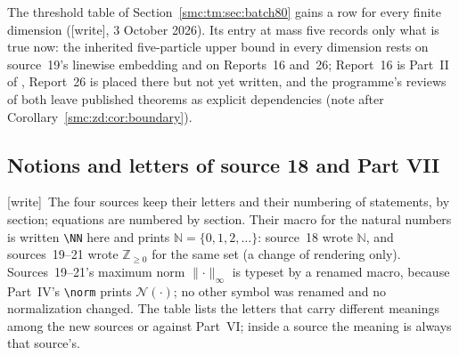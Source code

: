 \documentclass[11pt,letterpaper]{article}
\numberwithin{equation}{section}
\theoremstyle{definition}
\theoremstyle{remark}
\newcommand{\NN}{\mathbb N}
\newcommand{\wtag}{\textup{[write]}}
\newcommand{\norm}[1]{\mathcal N(#1)}
\begin{document}
The threshold table of Section~\ref{smc:tm:sec:batch80} gains a row for every finite dimension (\wtag, 3 October 2026). Its entry at mass five records only what is true now: the inherited five-particle upper bound in every dimension rests on source~19's linewise embedding and on Reports~16 and~26; Report~16 is Part~II of , Report~26 is placed there but not yet written, and the programme's reviews of both leave published theorems as explicit dependencies (note after Corollary~\ref{smc:zd:cor:boundary}).

\subsection{Notions and letters of source 18 and Part VII}\label{smc:zd:sec:notation}

\wtag\ The four sources keep their letters and their numbering of statements, by section; equations are numbered by section. Their macro for the natural numbers is written \verb|\NN| here and prints $\NN=\{0,1,2,\ldots\}$: source~18 wrote $\mathbb N$, and sources~19--21 wrote $\mathbb Z_{\ge0}$ for the same set (a change of rendering only). Sources~19--21's maximum norm $\lVert\cdot\rVert_\infty$ is typeset by a renamed macro, because Part~IV's \verb|\norm| prints $\norm{\cdot}$; no other symbol was renamed and no normalization changed. The table lists the letters that carry different meanings among the new sources or against Part~VI; inside a source the meaning is always that source's.
\end{document}
